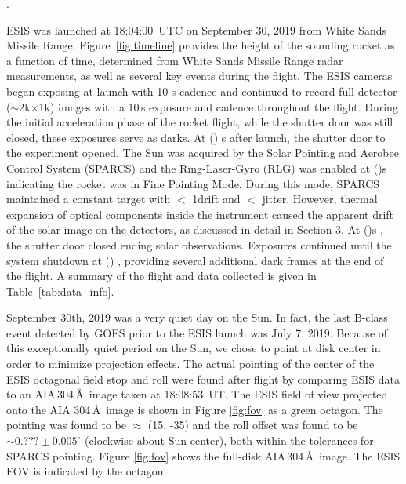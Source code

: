 . 

		ESIS was launched at 18:04:00~UTC  on September 30, 2019 \rts{\dateMission} from White Sands Missile Range.  Figure~\ref{fig:timeline} provides the height of the sounding rocket as a function of time, determined from White Sands Missile Range radar measurements, as well as several key events during the flight.  The ESIS cameras began exposing at launch with 10 s cadence and continued to record full detector ($\sim$2k$\times$1k) images with a 10\,s exposure and cadence throughout the flight. During the initial acceleration phase of the rocket flight, while the shutter door was still closed, these exposures serve as darks.  At () s \rts{\timeMissionShutterOpen} after launch, the shutter door to the experiment opened.  The Sun was acquired by the Solar Pointing and Aerobee Control System (SPARCS) and the Ring-Laser-Gyro  (RLG) was enabled at ()s \rts{\timeMissionRlgEnable} indicating the rocket was in Fine Pointing Mode.  During this mode, SPARCS maintained a constant target with $<$ 1\arcsec drift and $< $ jitter.  However, thermal expansion of optical components inside the instrument caused the apparent drift of the solar image on the detectors, as discussed in detail in Section 3.  At ()s \rts{\timeMissionShutterClose}, the shutter door closed ending solar observations.  Exposures continued until the system shutdown at () , providing several additional dark frames at the end of the flight.   A summary of the flight and data collected is given in Table~\ref{tab:data_info}.
		
		September 30th, 2019 \rts{\dateMission} was a very quiet day on the Sun.  In fact, the last  B-class event detected by GOES \citep{GOES} prior to the ESIS launch was July 7, 2019.  Because of this exceptionally quiet period on the Sun, we chose to point at disk center in order to minimize projection effects.   The actual pointing of the center of the ESIS octagonal field stop and roll were found after flight by comparing ESIS  data to an AIA\,304\,\AA\ image taken at 18:08:53~UT.  The ESIS field of view projected onto the AIA 304\,\AA\ image is shown in Figure \ref{fig:fov} as a green octagon.  The pointing was found to be $\approx$ (15\arcsec, -35\arcsec) and the roll offset was found to be $\sim0.???\pm 0.005^\circ$ (clockwise about Sun center), both within the tolerances for SPARCS pointing.  Figure \ref{fig:fov} shows the full-disk AIA\,304\,\AA\ image. The ESIS FOV is indicated by the octagon.  
		
